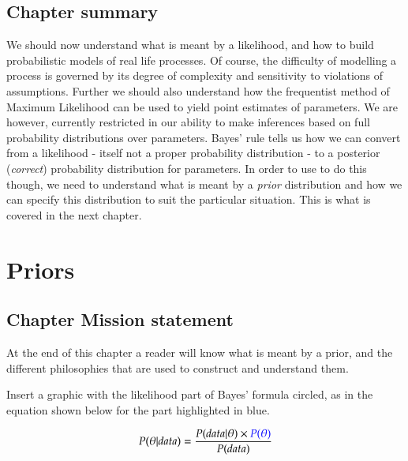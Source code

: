 \documentclass[11pt,fullpage]{book}
\begin{document}
\section{Chapter summary}
We should now understand what is meant by a likelihood, and how to build probabilistic models of real life processes. Of course, the difficulty of modelling a process is governed by its degree of complexity and sensitivity to violations of assumptions. Further we should also understand how the frequentist method of Maximum Likelihood can be used to yield point estimates of parameters. We are however, currently restricted in our ability to make inferences based on full probability distributions over parameters. Bayes' rule tells us how we can convert from a likelihood - itself not a proper probability distribution - to a posterior (\textit{correct}) probability distribution for parameters. In order to use to do this though, we need to understand what is meant by a \textit{prior} distribution and how we can specify this distribution to suit the particular situation. This is what is covered in the next chapter.

\chapter{Priors}
\section{Chapter Mission statement}
At the end of this chapter a reader will know what is meant by a prior, and the different philosophies that are used to construct and understand them. 

Insert a graphic with the likelihood part of Bayes' formula circled, as in the equation shown below for the part highlighted in blue.

\begin{equation}
P(\theta|data) = \frac{P(data|\theta)\times {\color{blue}P(\theta)}}{P(data)}
\end{equation}\label{eq:Prior_BayesHighlighted}
\end{document}
